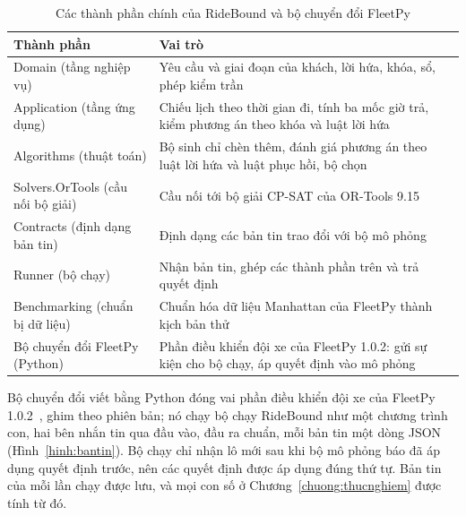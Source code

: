\begin{table}[htbp]
\centering
\caption{Các thành phần chính của RideBound và bộ chuyển đổi FleetPy}
\label{bang:kientruc}
\small
\begin{tabular}{@{}p{4.6cm}p{10.2cm}@{}}
\toprule
\textbf{Thành phần} & \textbf{Vai trò}\\
\midrule
Domain (tầng nghiệp vụ) & Yêu cầu và giai đoạn của khách, lời hứa, khóa, sổ, phép kiểm trần\\
Application (tầng ứng dụng) & Chiếu lịch theo thời gian đi, tính ba mốc giờ trả, kiểm phương án theo khóa và luật
lời hứa\\
Algorithms (thuật toán) & Bộ sinh chỉ chèn thêm, đánh giá phương án theo luật lời hứa và luật phục hồi, bộ chọn\\
Solvers.OrTools (cầu nối bộ giải) & Cầu nối tới bộ giải CP-SAT của OR-Tools 9.15\\
Contracts (định dạng bản tin) & Định dạng các bản tin trao đổi với bộ mô phỏng\\
Runner (bộ chạy) & Nhận bản tin, ghép các thành phần trên và trả quyết định\\
Benchmarking (chuẩn bị dữ liệu) & Chuẩn hóa dữ liệu Manhattan của FleetPy thành kịch bản thử\\
Bộ chuyển đổi FleetPy (Python) & Phần điều khiển đội xe của FleetPy 1.0.2: gửi sự kiện cho bộ chạy, áp quyết định
vào mô phỏng\\
\bottomrule
\end{tabular}
\end{table}

Bộ chuyển đổi viết bằng Python đóng vai phần điều khiển đội xe của FleetPy 1.0.2~\cite{engelhardt2026}, ghim theo
phiên bản; nó chạy bộ chạy RideBound như một chương trình con, hai bên nhắn tin qua đầu vào, đầu ra chuẩn, mỗi bản
tin một dòng JSON (Hình~\ref{hinh:bantin}). Bộ chạy chỉ nhận lô mới sau khi bộ mô phỏng báo đã áp dụng quyết định
trước, nên các quyết định được áp dụng đúng thứ tự. Bản tin của mỗi lần chạy được lưu, và mọi con số ở
Chương~\ref{chuong:thucnghiem} được tính từ đó.

